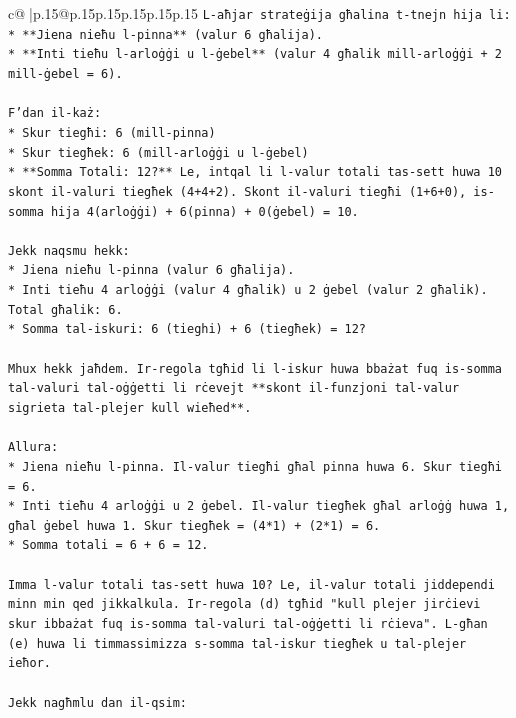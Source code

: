 \documentclass{article}
\begin{document}
{\begin{supertabular}{c@{$\;$}|p{.15\linewidth}@{}p{.15\linewidth}p{.15\linewidth}p{.15\linewidth}p{.15\linewidth}p{.15\linewidth}}
{{{\texttt{L{-}aħjar strateġija għalina t{-}tnejn hija li:} \\
\texttt{*   **Jiena nieħu l{-}pinna** (valur 6 għalija).} \\
\texttt{*   **Inti tieħu l{-}arloġġi u l{-}ġebel** (valur 4 għalik mill{-}arloġġi + 2 mill{-}ġebel = 6).} \\
\\ 
\texttt{F'dan il{-}każ:} \\
\texttt{*   Skur tiegħi: 6 (mill{-}pinna)} \\
\texttt{*   Skur tiegħek: 6 (mill{-}arloġġi u l{-}ġebel)} \\
\texttt{*   **Somma Totali: 12?** Le, intqal li l{-}valur totali tas{-}sett huwa 10 skont il{-}valuri tiegħek (4+4+2). Skont il{-}valuri tiegħi (1+6+0), is{-}somma hija 4(arloġġi) + 6(pinna) + 0(ġebel) = 10.} \\
\\ 
\texttt{Jekk naqsmu hekk:} \\
\texttt{*   Jiena nieħu l{-}pinna (valur 6 għalija).} \\
\texttt{*   Inti tieħu 4 arloġġi (valur 4 għalik) u 2 ġebel (valur 2 għalik). Total għalik: 6.} \\
\texttt{*   Somma tal{-}iskuri: 6 (tieghi) + 6 (tiegħek) = 12?} \\
\\ 
\texttt{Mhux hekk jaħdem. Ir{-}regola tgħid li l{-}iskur huwa bbażat fuq is{-}somma tal{-}valuri tal{-}oġġetti li rċevejt **skont il{-}funzjoni tal{-}valur sigrieta tal{-}plejer kull wieħed**.} \\
\\ 
\texttt{Allura:} \\
\texttt{*   Jiena nieħu l{-}pinna. Il{-}valur tiegħi għal pinna huwa 6. Skur tiegħi = 6.} \\
\texttt{*   Inti tieħu 4 arloġġi u 2 ġebel. Il{-}valur tiegħek għal arloġġ huwa 1, għal ġebel huwa 1. Skur tiegħek = (4*1) + (2*1) = 6.} \\
\texttt{*   Somma totali = 6 + 6 = 12.} \\
\\ 
\texttt{Imma l{-}valur totali tas{-}sett huwa 10? Le, il{-}valur totali jiddependi minn min qed jikkalkula. Ir{-}regola (d) tgħid "kull plejer jirċievi skur ibbażat fuq is{-}somma tal{-}valuri tal{-}oġġetti li rċieva". L{-}għan (e) huwa li timmassimizza s{-}somma tal{-}iskur tiegħek u tal{-}plejer ieħor.} \\
\\ 
\texttt{Jekk nagħmlu dan il{-}qsim:} \\
}}}
\end{supertabular}}
\end{document}

